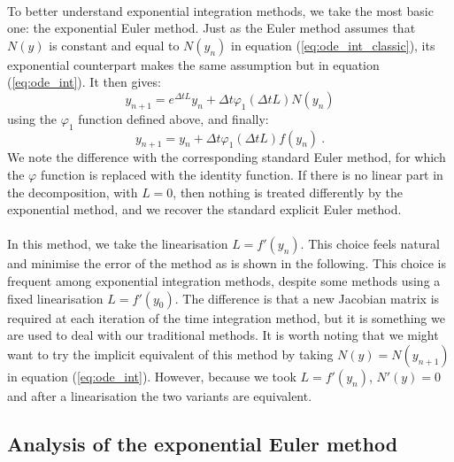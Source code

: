       \paragraph{}
      To better understand exponential integration methods, we take the most basic one: the exponential Euler method.
      Just as the Euler method assumes that $N\left(y\right)$ is constant and equal to $N\left(y_n\right)$ in equation (\ref{eq:ode_int_classic}), its exponential counterpart makes the same assumption but in equation (\ref{eq:ode_int}).
      It then gives:
      \begin{equation}
        y_{n+1} = e^{\Delta t L} y_n + \Delta t \varphi_1\left(\Delta t L\right) N\left(y_n\right)
      \end{equation}
      using the $\varphi_1$ function defined above, and finally:
      \begin{equation}
        y_{n+1} = y_n + \Delta t \varphi_1\left(\Delta t L\right) f\left(y_n\right) \ .
      \end{equation}
      We note the difference with the corresponding standard Euler method, for which the $\varphi$ function is replaced with the identity function.
      If there is no linear part in the decomposition, with $L = 0$, then nothing is treated differently by the exponential method, and we recover the standard explicit Euler method.

      \paragraph{}
      In this method, we take the linearisation $L = f'\left(y_n\right)$.
      This choice feels natural and minimise the error of the method as is shown in the following.
      This choice is frequent among exponential integration methods, despite some methods using a fixed linearisation $L = f'\left(y_0\right)$.
      The difference is that a new Jacobian matrix is required at each iteration of the time integration method, but it is something we are used to deal with our traditional methods.
      It is worth noting that we might want to try the implicit equivalent of this method by taking $N\left(y\right) = N\left(y_{n+1}\right)$ in equation (\ref{eq:ode_int}).
      However, because we took $L = f'\left(y_n\right)$, $N'\left(y\right) = 0$ and after a linearisation the two variants are equivalent.


    \subsection{Analysis of the exponential Euler method}

